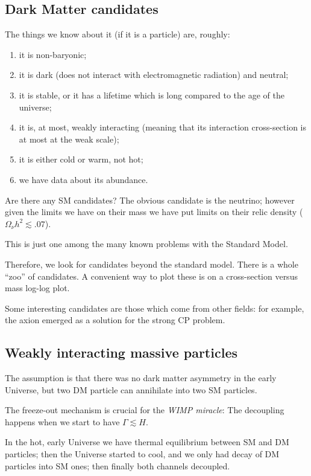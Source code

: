 \documentclass[main.tex]{subfiles}
\begin{document}
\subsection{Dark Matter candidates}

The things we know about it (if it is a particle) are, roughly: 
\begin{enumerate}
    \item it is non-baryonic;
    \item it is dark (does not interact with electromagnetic radiation) and neutral;
    \item it is stable, or it has a lifetime which is long compared to the age of the universe;
    \item it is, at most, weakly interacting (meaning that its interaction cross-section is at most at the weak scale);
    \item it is either cold or warm, not hot;
    \item we have data about its abundance. 
\end{enumerate}

Are there any SM candidates? 
The obvious candidate is the neutrino; however given the limits we have on their mass 
we have put limits on their relic density (\(\Omega_\nu h^2 \lesssim \num{.07}\)). 

This is just one among the many known problems with the Standard Model. 

Therefore, we look for candidates beyond the standard model. 
There is a whole ``zoo'' of candidates. 
A convenient way to plot these is on a cross-section versus mass log-log plot.

Some interesting candidates are those which come from other fields: 
for example, the axion emerged as a solution for the strong CP problem. 

\subsection{Weakly interacting massive particles}

The assumption is that there was no dark matter asymmetry in the early Universe,
but two DM particle can annihilate into two SM particles. 

The freeze-out mechanism is crucial for the \emph{WIMP miracle}: 
The decoupling happens when we start to have \(\Gamma \lesssim H\). 

In the hot, early Universe we have thermal equilibrium between SM and DM particles;
then the Universe started to cool, and we only had decay of DM particles into SM ones;
then finally both channels decoupled. 
\end{document}
